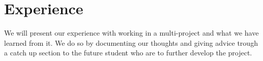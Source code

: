 \chapter{Experience}
We will present our experience with working in a multi-project and what we have learned from it. We do so by documenting our thoughts and giving advice trough a catch up section to the future student who are to further develop the project.


